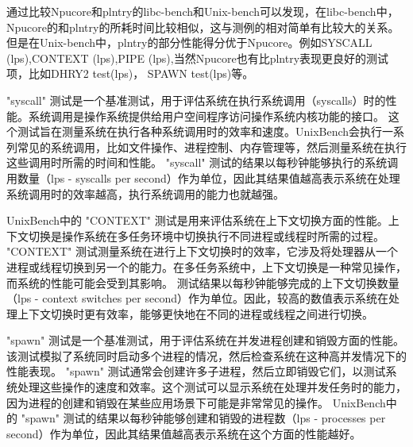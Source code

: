 通过比较Npucore和plntry的libc-bench和Unix-bench可以发现，在libc-bench中，Npucore的和plntry的所耗时间比较相似，这与测例的相对简单有比较大的关系。但是在Unix-bench中，plntry的部分性能得分优于Npucore。例如SYSCALL (lps),CONTEXT (lps),PIPE (lps),当然Npucore也有比plntry表现更良好的测试项，比如DHRY2 test(lps)， SPAWN test(lps)等。

"syscall" 测试是一个基准测试，用于评估系统在执行系统调用（syscalls）时的性能。系统调用是操作系统提供给用户空间程序访问操作系统内核功能的接口。
这个测试旨在测量系统在执行各种系统调用时的效率和速度。UnixBench会执行一系列常见的系统调用，比如文件操作、进程控制、内存管理等，然后测量系统在执行这些调用时所需的时间和性能。
"syscall" 测试的结果以每秒钟能够执行的系统调用数量（lps - syscalls per second）作为单位，因此其结果值越高表示系统在处理系统调用时的效率越高，执行系统调用的能力也就越强。

UnixBench中的 "CONTEXT" 测试是用来评估系统在上下文切换方面的性能。上下文切换是操作系统在多任务环境中切换执行不同进程或线程时所需的过程。
"CONTEXT" 测试测量系统在进行上下文切换时的效率，它涉及将处理器从一个进程或线程切换到另一个的能力。在多任务系统中，上下文切换是一种常见操作，而系统的性能可能会受到其影响。
测试结果以每秒钟能够完成的上下文切换数量（lps - context switches per second）作为单位。因此，较高的数值表示系统在处理上下文切换时更有效率，能够更快地在不同的进程或线程之间进行切换。

"spawn" 测试是一个基准测试，用于评估系统在并发进程创建和销毁方面的性能。该测试模拟了系统同时启动多个进程的情况，然后检查系统在这种高并发情况下的性能表现。
"spawn" 测试通常会创建许多子进程，然后立即销毁它们，以测试系统处理这些操作的速度和效率。这个测试可以显示系统在处理并发任务时的能力，因为进程的创建和销毁在某些应用场景下可能是非常常见的操作。
UnixBench中的 "spawn" 测试的结果以每秒钟能够创建和销毁的进程数（lps - processes per second）作为单位，因此其结果值越高表示系统在这个方面的性能越好。



